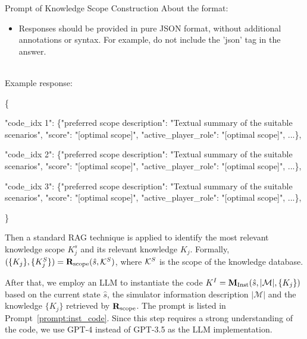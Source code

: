 \begin{gbox}{Prompt of Knowledge Scope Construction}
About the format:
\begin{itemize}
    \item Responses should be provided in pure JSON format, without additional annotations or syntax. For example, do not include the 'json' tag in the answer.
\end{itemize}
~\\

Example response:

\{

\hspace{5mm} "code\_idx 1": \{"preferred scope description": "Textual summary of the suitable scenarios", "score": "[optimal scope]", "active\_player\_role": "[optimal scope]", ...\},

\hspace{5mm} "code\_idx 2": \{"preferred scope description": "Textual summary of the suitable scenarios", "score": "[optimal scope]", "active\_player\_role": "[optimal scope]", ...\},

\hspace{5mm} "code\_idx 3": \{"preferred scope description": "Textual summary of the suitable scenarios", "score": "[optimal scope]", "active\_player\_role": "[optimal scope]", ...\},

\}

\end{gbox}


Then a standard RAG technique is applied to identify the most relevant knowledge scope $K^s_j$ and its relevant knowledge $K_j$. Formally, $(\{K_j\}, \{K^S_j\})=\mathbf{R}_{\rm scope}(\hat s, \mathcal{K}^{S})$, where $\mathcal{K}^{S}$ is the scope of the knowledge database. 


After that, we employ an LLM to instantiate the code $K^I=\mathbf{M}_{\rm Inst}(\hat s, |\mathcal{M}|, \{K_j\})$ based on the current state $\hat s$, the simulator information description $|\mathcal{M}|$ and the knowledge $\{K_j\}$ retrieved by $\mathbf{R}_{\rm scope}$. The prompt is listed in Prompt~\ref{prompt:inst_code}. Since this step requires a strong understanding of the code, we use GPT-4 instead of GPT-3.5 as the LLM implementation.



